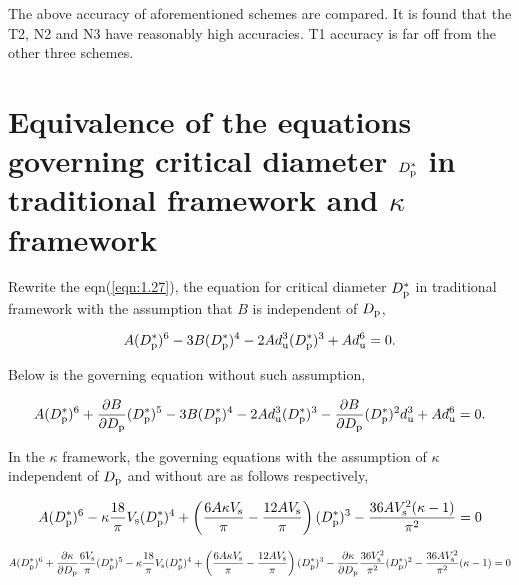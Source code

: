\documentclass[12pt]{article}
\begin{document}
{The above accuracy of aforementioned schemes are compared. It is found that the T2, N2 and N3 have reasonably high accuracies. T1 accuracy is far off from the other three schemes.


\section{Equivalence of the equations governing critical diameter $D_{\rm p}^{*}$ in traditional framework and $\kappa$ framework}

Rewrite the eqn(\ref{eqn:1.27}), the equation for critical diameter $D_{\rm p}^{*}$ in traditional framework with the assumption that $B$ is independent of $D_{\rm p}$,

\begin{equation}\label{eqn:12.1}
A(D_{\rm p}^{*})^{6}-3B(D_{\rm p}^{*})^{4}-2 Ad_{\rm u}^{3}(D_{\rm p}^{*})^{3}+ A d_{\rm u}^{6}=0.
\end{equation}

Below is the governing equation without such assumption, 

\begin{equation}\label{eqn:12.2}
A(D_{\rm p}^{*})^{6}+ 
\frac{\partial B}{\partial D_{\rm p}}(D_{\rm p}^{*})^{5}-3B(D_{\rm p}^{*})^{4}-2 Ad_{\rm u}^{3} (D_{\rm p}^{*})^{3} 
-\frac{\partial B}{\partial D_{\rm p}}(D_{\rm p}^{*})^{2}d_{\rm u}^{3}+ A d_{\rm u}^{6}=0.
\end{equation}

In the $\kappa$ framework, the governing equations with the assumption of $\kappa$ independent of $D_{\rm p}$ and without are as follows respectively, 

\begin{equation}\label{eqn:12.3}
A(D_{\rm p}^{*})^{6}-\kappa\frac{18}{\pi}V_{\rm s}(D_{\rm p}^{*})^4+\left(\frac{6 A \kappa V_{\rm s}}{\pi}-\frac{12 A V_{\rm s}}{\pi}\right)(D_{\rm p}^{*})^{3} - \frac{36A V_{\rm s}^2(\kappa -1)}{\pi^2} =0
\end{equation}

\begin{equation}\label{eqn:12.4}
A(D_{\rm p}^{*})^{6}+
\frac{\partial \kappa}{\partial D_{\rm p}}\frac{6 V_{\rm s}}{\pi}(D_{\rm p}^{*})^{5}
-\kappa\frac{18}{\pi}V_{\rm s}(D_{\rm p}^{*})^4+
\left(\frac{6 A \kappa V_{\rm s}}{\pi}-\frac{12 A V_{\rm s}}{\pi}\right)(D_{\rm p}^{*})^{3}
-\frac{\partial \kappa}{\partial D_{\rm p}}\frac{36 V_{\rm s}^{2}}{\pi^{2}}(D_{\rm p}^{*})^{2}
 -\frac{36 A V_{\rm s}^{2}}{\pi^{2}}(\kappa -1) =0
\end{equation}

}
\end{document}
